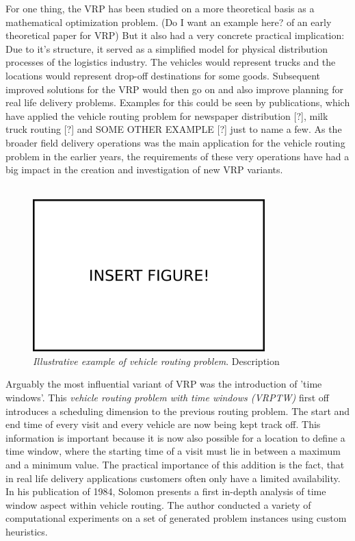 For one thing, the VRP has been studied on a more theoretical basis as a mathematical optimization problem. (Do I want an example here? of an early theoretical paper for VRP) But it also had a very concrete practical implication: Due to it's structure, it served as a simplified model for physical distribution processes of the logistics industry. The vehicles would represent trucks and the locations would represent drop-off destinations for some goods. Subsequent improved solutions for the VRP would then go on and also improve planning for real life delivery problems. Examples for this could be seen by publications, which have applied the vehicle routing problem for newspaper distribution [?], milk truck routing [?] and SOME OTHER EXAMPLE [?] just to name a few. As the broader field delivery operations was the main application for the vehicle routing problem in the earlier years, the requirements of these very operations have had a big impact in the creation and investigation of new VRP variants.\\ \\
\begin{figure}
\centering
\includegraphics[width=0.8\textwidth]{img/insert_figure_here.png}
\caption[Multi-Robot Task Allocation Taxonomy]{\label{fig:vrp-illustration} \textit{Illustrative example of vehicle routing problem}. Description}
\end{figure}
Arguably the most influential variant of VRP was the introduction of 'time windows'. This \textit{vehicle routing problem with time windows (VRPTW)} first off introduces a scheduling dimension to the previous routing problem. The start and end time of every visit and every vehicle are now being kept track off. This information is important because it is now also possible for a location to define a time window, where the starting time of a visit must lie in between a maximum and a minimum value. The practical importance of this addition is the fact, that in real life delivery applications customers often only have a limited availability. In his publication of 1984, Solomon \cite{solomon_algorithms_1987} presents a first in-depth analysis of time window aspect within vehicle routing. The author conducted a variety of computational experiments on  a set of generated problem instances using custom heuristics.\\
